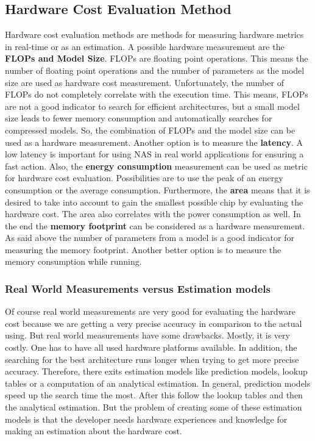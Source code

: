 \documentclass[conference]{IEEEtran}
\begin{document}
\subsection{Hardware Cost Evaluation Method}
Hardware cost evaluation methods are methods for measuring hardware metrics in real-time or as an estimation. A possible hardware measurement are the \textbf{FLOPs and Model Size}. FLOPs are floating point operations. This means the number of floating point operations and the number of parameters as the model size are used as hardware cost measurement. Unfortunately, the number of FLOPs do not completely correlate with the execution time. This means, FLOPs are not a good indicator to search for efficient architectures, but a small model size leads to fewer memory consumption and automatically searches for compressed models. So, the combination of FLOPs and the model size can be used as a hardware measurement. Another option is to measure the \textbf{latency}. A low latency is important for using NAS in real world applications for ensuring a fast action. Also, the \textbf{energy consumption} measurement can be used as metric for hardware cost evaluation. Possibilities are to use the peak of an energy consumption or the average consumption. Furthermore, the \textbf{area} means that it is desired to take into account to gain the smallest possible chip by evaluating the hardware cost. The area also correlates with the power consumption as well. In the end the \textbf{memory footprint} can be considered as a hardware measurement. As said above the number of parameters from a model is a good indicator for measuring the memory footprint. Another better option is to measure the memory consumption while running.     

\subsubsection{Real World Measurements versus Estimation models}

Of course real world measurements are very good for evaluating the hardware cost because we are getting a very precise accuracy in comparison to the actual using. But real world measurements have some drawbacks. Mostly, it is very costly. One has to have all used hardware platforms available. In addition, the searching for the best architecture runs longer when trying to get more precise accuracy. Therefore, there exits estimation models like prediction models, lookup tables or a computation of an analytical estimation. In general, prediction models speed up the search time the most. After this follow the lookup tables and then the analytical estimation. But the problem of creating some of these estimation models is that the developer needs hardware experiences and knowledge for making an estimation about the hardware cost.
\end{document}
